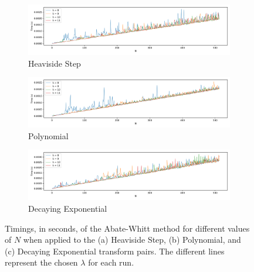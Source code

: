 \documentclass[a4paper]{report}
\begin{document}
\begin{figure}[H]
    \begin{subfigure}{1\linewidth}
      \includegraphics[width=\linewidth]{images/abate_whitt/heaviside_speed.png}
      \caption{Heaviside Step}
    \end{subfigure}
    
    \medskip
    
    \begin{subfigure}{1\linewidth}
      \includegraphics[width=\linewidth]{images/abate_whitt/polynomial_speed.png}
      \caption{Polynomial}
    \end{subfigure}
    
    \medskip
    
    \begin{subfigure}{1\linewidth}
      \includegraphics[width=\linewidth]{images/abate_whitt/decay_exp_speed.png}
      \caption{Decaying Exponential}
    \end{subfigure}
    
    \caption{Timings, in seconds, of the Abate-Whitt method for different values of $N$ when applied to the (a) Heaviside Step, (b) Polynomial, and (c) Decaying Exponential transform pairs. The different lines represent the chosen $\lambda$ for each run.}
    \label{fig:timings_abate_whitt}
\end{figure}
\end{document}
